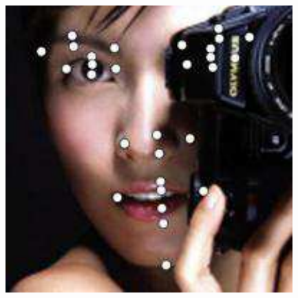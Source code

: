 \documentclass[journal]{IEEEtran}
\begin{document}
\begin{figure}[!htb]
{\begin{minipage}[b]{0.38\textwidth}
\includegraphics[scale=0.22]{29_CFT_115}


\end{minipage}}
\end{figure}
\end{document}

